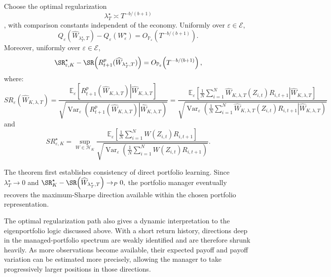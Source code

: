 \begin{theorem}
\label{thm:rate}
Choose the optimal regularization 
$$\lambda_T^\star\asymp T^{-b/(b+1)}$$, with comparison constants independent
of the economy. Uniformly over $\varepsilon\in\mathcal E$,
\begin{equation}
Q_\varepsilon(\widehat W_{\lambda_T^\star,T})
-
Q_\varepsilon(W^\star_\varepsilon)
=
O_{\mathbb P_\varepsilon}\!\left(T^{-b/(b+1)}\right).
\label{eq:portfolio-loss-rate}
\end{equation}
Moreover, uniformly over $\varepsilon\in\mathcal E$,
\begin{equation}
\SR^\star_{\varepsilon,K}
-
\SR\!\left(R^p_{t+1}(\widehat W_{\lambda_T^\star,T})\right)
=
O_{\mathbb P_\varepsilon}\!\left(T^{-b/(b+1)}\right),
\label{eq:sharpe-level-rate}
\end{equation}
where:
\[
SR_\varepsilon\!\left(\widehat W_{K,\lambda,T}\right)
=
\frac{
\mathbb E_\varepsilon
\left[
\left.
R^p_{t+1}\!\left(\widehat W_{K,\lambda,T}\right)
\right|
\widehat W_{K,\lambda,T}
\right]
}{
\sqrt{
\operatorname{Var}_\varepsilon
\left(
\left.
R^p_{t+1}\!\left(\widehat W_{K,\lambda,T}\right)
\right|
\widehat W_{K,\lambda,T}
\right)
}
}
=
\frac{
\displaystyle
\mathbb E_\varepsilon
\left[
\left.
\frac{1}{N}
\sum_{i=1}^N
\widehat W_{K,\lambda,T}(Z_{i,t})R_{i,t+1}
\right|
\widehat W_{K,\lambda,T}
\right]
}{
\displaystyle
\sqrt{
\operatorname{Var}_\varepsilon
\left(
\left.
\frac{1}{N}
\sum_{i=1}^N
\widehat W_{K,\lambda,T}(Z_{i,t})R_{i,t+1}
\right|
\widehat W_{K,\lambda,T}
\right)
}
}
\]
and
\[
SR^\star_{\varepsilon,K}
=
\sup_{W\in\mathcal H_K}
\frac{
\mathbb E_\varepsilon
\left[
\frac{1}{N}
\sum_{i=1}^N
W(Z_{i,t})R_{i,t+1}
\right]
}{
\sqrt{
\operatorname{Var}_\varepsilon
\left(
\frac{1}{N}
\sum_{i=1}^N
W(Z_{i,t})R_{i,t+1}
\right)
}
}.
\]
\end{theorem}

The theorem first establishes consistency of direct portfolio learning. Since
$\lambda_T^\star\rightarrow0$ and
$
\SR_K^\star
-
\SR\!\left(
\widehat W_{\lambda_T^\star,T}
\right)
\rightarrow_P0,
$
the portfolio manager eventually recovers the maximum-Sharpe direction
available within the chosen portfolio representation.

The optimal regularization path also gives a dynamic interpretation to the
eigenportfolio logic discussed above. With a short return history, directions
deep in the managed-portfolio spectrum are weakly identified and are therefore
shrunk heavily. As more observations become available, their expected payoff
and payoff variation can be estimated more precisely, allowing the manager to
take progressively larger positions in those directions.

